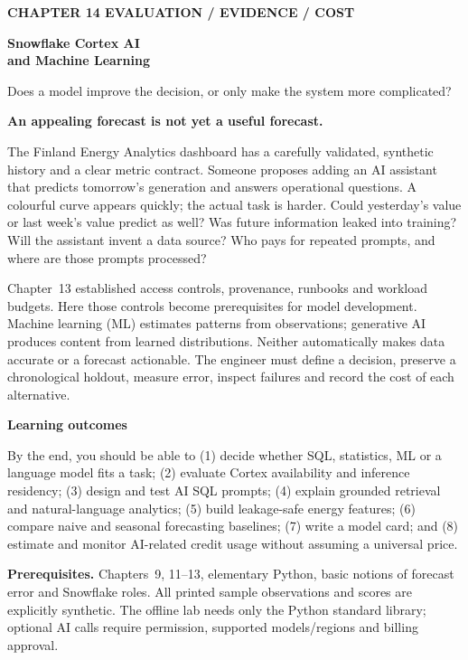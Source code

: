 \documentclass[11pt,twoside]{article}
\begin{document}
{\sffamily\bfseries\fontsize{9}{11}\selectfont\color{steelblue} CHAPTER 14 \hfill EVALUATION / EVIDENCE / COST}\par\vspace{3mm}
{\sffamily\bfseries\fontsize{20}{23}\selectfont\color{navy} Snowflake Cortex AI\\and Machine Learning}\par\vspace{2mm}
{\sffamily\fontsize{11}{14}\selectfont\color{steelblue} Does a model improve the decision, or only make the system more complicated?}\par\vspace{3mm}
\begin{insight}\textbf{An appealing forecast is not yet a useful forecast.}\par
The Finland Energy Analytics dashboard has a carefully validated, synthetic history and a clear metric contract. Someone proposes adding an AI assistant that predicts tomorrow's generation and answers operational questions. A colourful curve appears quickly; the actual task is harder. Could yesterday's value or last week's value predict as well? Was future information leaked into training? Will the assistant invent a data source? Who pays for repeated prompts, and where are those prompts processed?
\end{insight}
Chapter~13 established access controls, provenance, runbooks and workload budgets. Here those controls become prerequisites for model development. Machine learning (ML) estimates patterns from observations; generative AI produces content from learned distributions. Neither automatically makes data accurate or a forecast actionable. The engineer must define a decision, preserve a chronological holdout, measure error, inspect failures and record the cost of each alternative.
\begin{whitebox}\textbf{Learning outcomes}\par
By the end, you should be able to (1) decide whether SQL, statistics, ML or a language model fits a task; (2) evaluate Cortex availability and inference residency; (3) design and test AI SQL prompts; (4) explain grounded retrieval and natural-language analytics; (5) build leakage-safe energy features; (6) compare naive and seasonal forecasting baselines; (7) write a model card; and (8) estimate and monitor AI-related credit usage without assuming a universal price.
\end{whitebox}
\textbf{Prerequisites.} Chapters~9, 11--13, elementary Python, basic notions of forecast error and Snowflake roles. All printed sample observations and scores are explicitly synthetic. The offline lab needs only the Python standard library; optional AI calls require permission, supported models/regions and billing approval.
\end{document}
